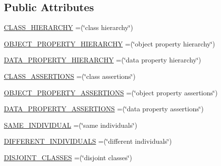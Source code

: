 \subsection*{Public Attributes}
\begin{DoxyCompactItemize}
\item 
\hyperlink{enumorg_1_1semanticweb_1_1owlapi_1_1reasoner_1_1_inference_type_a0a8d1458b4a14688930f339376eb22ae}{C\-L\-A\-S\-S\-\_\-\-H\-I\-E\-R\-A\-R\-C\-H\-Y} =(\char`\"{}class hierarchy\char`\"{})
\item 
\hyperlink{enumorg_1_1semanticweb_1_1owlapi_1_1reasoner_1_1_inference_type_aeae299f44074d86395601f75eb712b80}{O\-B\-J\-E\-C\-T\-\_\-\-P\-R\-O\-P\-E\-R\-T\-Y\-\_\-\-H\-I\-E\-R\-A\-R\-C\-H\-Y} =(\char`\"{}object property hierarchy\char`\"{})
\item 
\hyperlink{enumorg_1_1semanticweb_1_1owlapi_1_1reasoner_1_1_inference_type_ab4be19862eac41e9ecb8a0ceb0b157f7}{D\-A\-T\-A\-\_\-\-P\-R\-O\-P\-E\-R\-T\-Y\-\_\-\-H\-I\-E\-R\-A\-R\-C\-H\-Y} =(\char`\"{}data property hierarchy\char`\"{})
\item 
\hyperlink{enumorg_1_1semanticweb_1_1owlapi_1_1reasoner_1_1_inference_type_aee5a2b344afb43ec9952bdcc41599242}{C\-L\-A\-S\-S\-\_\-\-A\-S\-S\-E\-R\-T\-I\-O\-N\-S} =(\char`\"{}class assertions\char`\"{})
\item 
\hyperlink{enumorg_1_1semanticweb_1_1owlapi_1_1reasoner_1_1_inference_type_a8a56528e9e3fe130e24af8ccbc4b4042}{O\-B\-J\-E\-C\-T\-\_\-\-P\-R\-O\-P\-E\-R\-T\-Y\-\_\-\-A\-S\-S\-E\-R\-T\-I\-O\-N\-S} =(\char`\"{}object property assertions\char`\"{})
\item 
\hyperlink{enumorg_1_1semanticweb_1_1owlapi_1_1reasoner_1_1_inference_type_a173785eb489f8bf2cc041ed60dc5a463}{D\-A\-T\-A\-\_\-\-P\-R\-O\-P\-E\-R\-T\-Y\-\_\-\-A\-S\-S\-E\-R\-T\-I\-O\-N\-S} =(\char`\"{}data property assertions\char`\"{})
\item 
\hyperlink{enumorg_1_1semanticweb_1_1owlapi_1_1reasoner_1_1_inference_type_a2b63264f556fe54ff2106bf9dffe905e}{S\-A\-M\-E\-\_\-\-I\-N\-D\-I\-V\-I\-D\-U\-A\-L} =(\char`\"{}same individuals\char`\"{})
\item 
\hyperlink{enumorg_1_1semanticweb_1_1owlapi_1_1reasoner_1_1_inference_type_a5667bc8a13ed1176f98a4b6a1fb7db05}{D\-I\-F\-F\-E\-R\-E\-N\-T\-\_\-\-I\-N\-D\-I\-V\-I\-D\-U\-A\-L\-S} =(\char`\"{}different individuals\char`\"{})
\item 
\hyperlink{enumorg_1_1semanticweb_1_1owlapi_1_1reasoner_1_1_inference_type_a2526984b676d7b1fa397969a16c8dd84}{D\-I\-S\-J\-O\-I\-N\-T\-\_\-\-C\-L\-A\-S\-S\-E\-S} =(\char`\"{}disjoint classes\char`\"{})
\end{DoxyCompactItemize}
